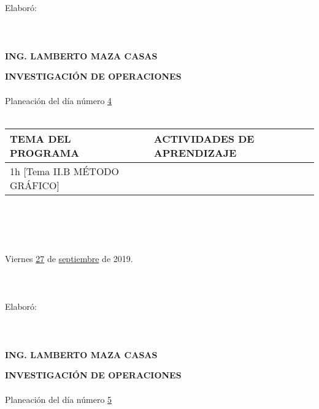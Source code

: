 \documentclass[landscape]{article}
\begin{document}
{\begin{center}
\ \\
\ \\
\ \\
\ \\
Elabor\'o:
\ \\
\ \\
\ \\
\ \\
{\bf ING. LAMBERTO MAZA CASAS}
\end{center}
\eject
\begin{center}
{\bf 
INVESTIGACI\'ON DE OPERACIONES
}
\ \\
\ \\
Planeaci\'on del d\'ia n\'umero \underline{\hspace{0.5cm}4\hspace{0.5cm}}
\ \\
\ \\
\begin{tabular}{|p{11cm}|p{8cm}|}\hline
{\bf TEMA DEL PROGRAMA}&{\bf ACTIVIDADES DE APRENDIZAJE}\\\hline
	1h	[Tema II.B M\'ETODO GR\'AFICO]
&\\
\hline
\end{tabular}
\ \\
\ \\
\ \\
\ \\
Viernes \underline{\hspace{0.5cm}27\hspace{0.5cm}} de  \underline{\hspace{0.5cm}septiembre\hspace{0.5cm}} de 2019.
\ \\
\ \\
\ \\
\ \\
Elabor\'o:
\ \\
\ \\
\ \\
\ \\
{\bf ING. LAMBERTO MAZA CASAS}
\end{center}
\eject
\begin{center}
{\bf 
INVESTIGACI\'ON DE OPERACIONES
}
\ \\
\ \\
Planeaci\'on del d\'ia n\'umero \underline{\hspace{0.5cm}5\hspace{0.5cm}}
\ \\
\ \\
\begin{tabular}{|p{11cm}|p{8cm}|}\hline

\end{tabular}
\end{center}}
\end{document}
